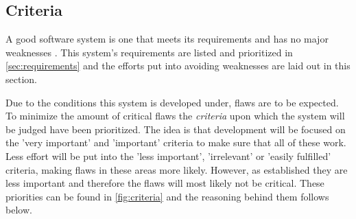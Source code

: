 \subsection{Criteria}\label{sec:architecturecriteria}
A good software system is one that meets its requirements and has no major weaknesses \citep[p.~179]{Rod-Aalborg}.
This system's requirements are listed and prioritized in \cref{sec:requirements} and the efforts put into avoiding weaknesses are laid out in this section.

Due to the conditions this system is developed under, flaws are to be expected.
To minimize the amount of critical flaws the \textit{criteria} \citep[p.~180]{Rod-Aalborg} upon which the system will be judged have been prioritized.
The idea is that development will be focused on the 'very important' and 'important' criteria to make sure that all of these work.
Less effort will be put into the 'less important', 'irrelevant' or 'easily fulfilled' criteria, making flaws in these areas more likely.
However, as established they are less important and therefore the flaws will most likely not be critical.
These priorities can be found in \cref{fig:criteria} and the reasoning behind them follows below.



